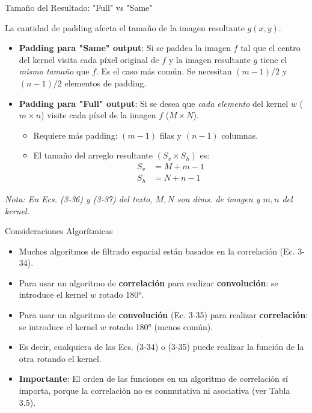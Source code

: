 \documentclass[10pt]{beamer}
\newcommand{\eqnum}[1]{\tag{#1}} %
\begin{document}
\begin{frame}[fragile]{Tamaño del Resultado: "Full" vs "Same"}
{\footnotesize
La cantidad de padding afecta el tamaño de la imagen resultante $g(x,y)$.
\begin{itemize}
\item \textbf{Padding para "Same" output}: Si se paddea la imagen $f$ tal que el centro del kernel visita cada píxel original de $f$ y la imagen resultante $g$ tiene el \textit{mismo tamaño} que $f$. Es el caso más común. Se necesitan $(m-1)/2$ y $(n-1)/2$ elementos de padding.
\item \textbf{Padding para "Full" output}: Si se desea que \textit{cada elemento} del kernel $w$ ($m \times n$) visite cada píxel de la imagen $f$ ($M \times N$).
\begin{itemize}
\item Requiere más padding: $(m-1)$ filas y $(n-1)$ columnas.
\item El tamaño del arreglo resultante $(S_v \times S_h)$ es:
\begin{align}
S_v &= M + m - 1 \eqnum{3-36} \\
S_h &= N + n - 1 \eqnum{3-37}
\end{align}
\end{itemize}
\end{itemize}
\textit{Nota: En Ecs. (3-36) y (3-37) del texto, $M,N$ son dims. de imagen y $m,n$ del kernel.}
}
\end{frame}

\begin{frame}{Consideraciones Algorítmicas}
{\footnotesize
\begin{itemize}
\item Muchos algoritmos de filtrado espacial están basados en la correlación (Ec. 3-34).
\item Para usar un algoritmo de \textbf{correlación} para realizar \textbf{convolución}: se introduce el kernel $w$ rotado 180°.
\item Para usar un algoritmo de \textbf{convolución} (Ec. 3-35) para realizar \textbf{correlación}: se introduce el kernel $w$ rotado 180° (menos común).
\item Es decir, cualquiera de las Ecs. (3-34) o (3-35) puede realizar la función de la otra rotando el kernel.
\item \textbf{Importante}: El orden de las funciones en un algoritmo de correlación sí importa, porque la correlación no es conmutativa ni asociativa (ver Tabla 3.5).
\end{itemize}
}
\end{frame}
\end{document}
